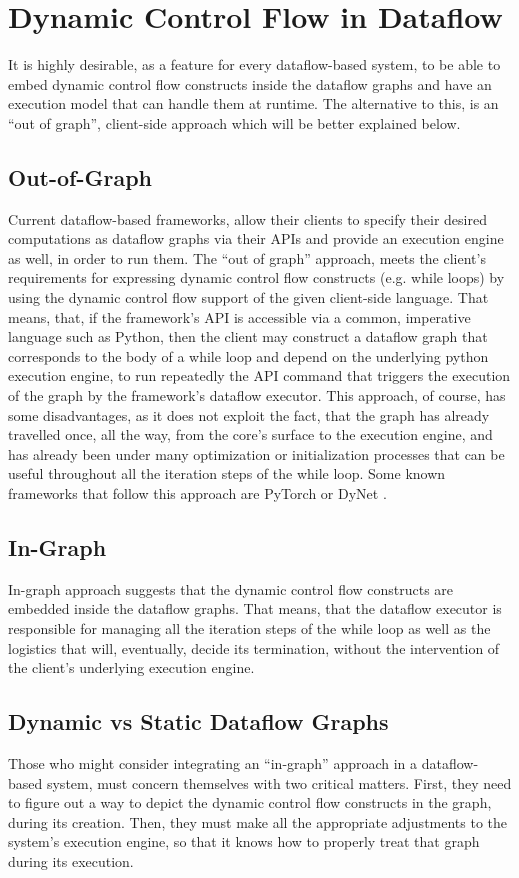 \documentclass[ack,preface]{dithesis}
\begin{document}
    \section{Dynamic Control Flow in Dataflow}
It is highly desirable, as a feature for every dataflow-based system, to be able to embed dynamic control flow constructs inside the dataflow graphs and have an execution model  that  can handle them at runtime. The alternative to this, is an “out of graph”, client-side approach which will be better explained below.

    \subsection{Out-of-Graph}
Current dataflow-based frameworks, allow their clients to specify their desired computations as dataflow graphs via their APIs and provide an execution engine as well, in order to run them. The “out of graph” approach, meets the client’s requirements for expressing dynamic control flow constructs (e.g. while loops) by using the dynamic control flow support of the given client-side language. That means, that, if the framework’s API is accessible via a common, imperative language such as Python, then the client may construct a dataflow graph that corresponds to the body of a while loop and depend on the underlying python execution engine, to run repeatedly the API command that triggers the execution of the graph by the framework’s dataflow executor. This approach, of course, has some disadvantages, as it does not exploit the fact, that the graph has already travelled once, all the way, from the core’s surface to the execution engine, and has already been under many optimization or initialization processes that can be useful throughout all the iteration steps of the while loop.
Some known frameworks that follow this approach are  PyTorch \cite{Paszke2017} or DyNet  \cite{ Neubig2017DyNetTD}.

    \subsection{In-Graph}
In-graph approach suggests that the dynamic control flow constructs are embedded inside the dataflow graphs. That means, that the dataflow executor is responsible for managing all the iteration steps of the while loop as well as the logistics that will, eventually, decide its termination, without the intervention of the client’s underlying execution engine.

    \subsection{Dynamic vs Static Dataflow Graphs}
Those who might consider integrating an “in-graph” approach in a dataflow-based system, must concern themselves with two critical matters. First, they need to figure out a way to depict the dynamic control flow constructs in the graph, during its creation. Then, they must make all the appropriate adjustments to the system’s execution engine, so that it knows how to properly treat that graph during its execution.
\end{document}
